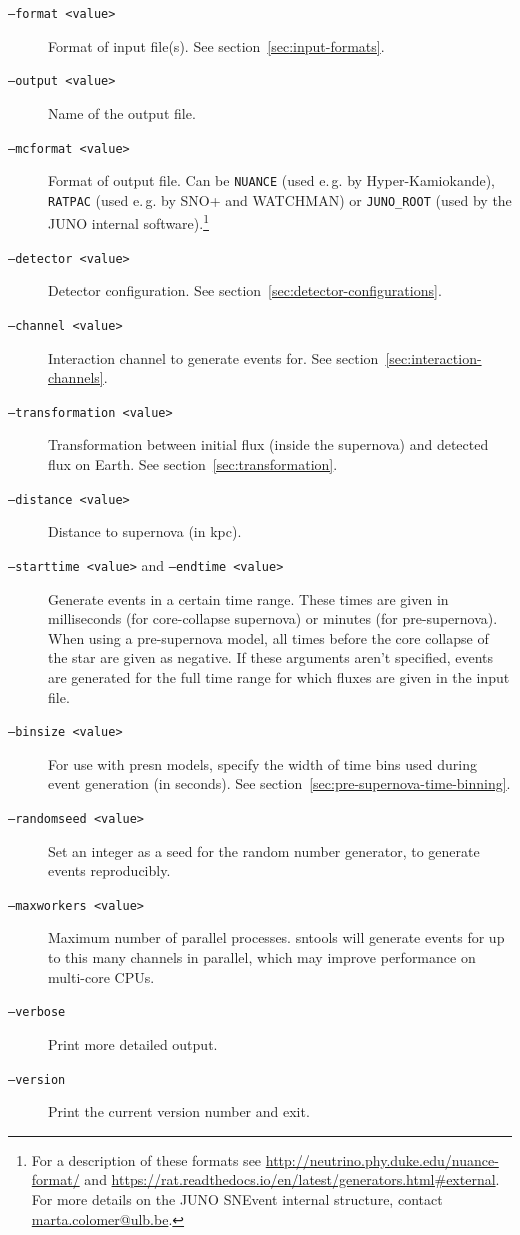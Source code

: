 \documentclass[11pt, oneside]{article}
\begin{document}
\begin{description}
\item[\texttt{--format <value>}] Format of input file(s). See section~\ref{sec:input-formats}.
\item[\texttt{--output <value>}] Name of the output file.
\item[\texttt{--mcformat <value>}] Format of output file. Can be \texttt{NUANCE} (used e.\,g. by Hyper-Kamiokande), \texttt{RATPAC} (used e.\,g. by SNO+ and WATCHMAN) or \texttt{JUNO\_ROOT} (used by the JUNO internal software).\footnote{For a description of these formats see \url{http://neutrino.phy.duke.edu/nuance-format/} and \url{https://rat.readthedocs.io/en/latest/generators.html\#external}. For more details on the JUNO SNEvent internal structure, contact \url{marta.colomer@ulb.be}.}

\item[\texttt{--detector <value>}] Detector configuration. See section~\ref{sec:detector-configurations}.
\item[\texttt{--channel <value>}] Interaction channel to generate events for. See section~\ref{sec:interaction-channels}.
\item[\texttt{--transformation <value>}] Transformation between initial flux (inside the supernova) and detected flux on Earth. See section~\ref{sec:transformation}.
\item[\texttt{--distance <value>}] Distance to supernova (in kpc).
\item[\texttt{--starttime <value>} and \texttt{--endtime <value>}] Generate events in a certain time range. These times are given in milliseconds (for core-collapse supernova) or minutes (for pre-supernova). When using a pre-supernova model, all times before the core collapse of the star are given as negative. If these arguments aren’t specified, events are generated for the full time range for which fluxes are given in the input file.
\item[\texttt{--binsize <value>}] For use with presn models, specify the width of time bins used during event generation (in seconds). See section~\ref{sec:pre-supernova-time-binning}.
\item[\texttt{--randomseed <value>}] Set an integer as a seed for the random number generator, to generate events reproducibly.
\item[\texttt{--maxworkers <value>}] Maximum number of parallel processes. sntools will generate events for up to this many channels in parallel, which may improve performance on multi-core CPUs.
\item[\texttt{--verbose}] Print more detailed output.
\item[\texttt{--version}] Print the current version number and exit.
\end{description}
\end{document}
